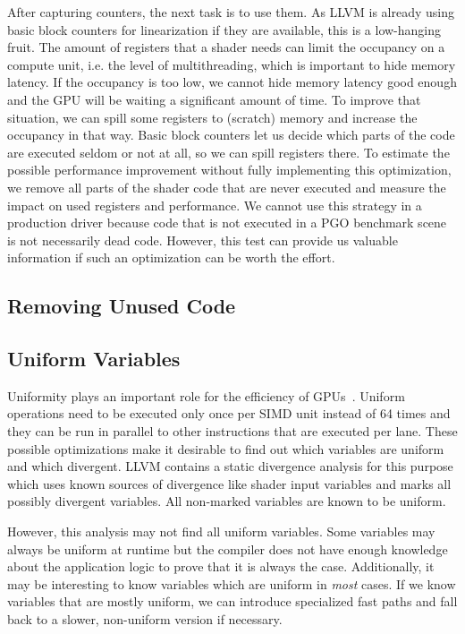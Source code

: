After capturing counters, the next task is to use them. As LLVM is already using basic block counters for linearization if they are available, this is a low-hanging fruit.
The amount of registers that a shader needs can limit the occupancy on a compute unit, i.e. the level of multithreading, which is important to hide memory latency.
If the occupancy is too low, we cannot hide memory latency good enough and the GPU will be waiting a significant amount of time.
To improve that situation, we can spill some registers to (scratch) memory and increase the occupancy in that way.
Basic block counters let us decide which parts of the code are executed seldom or not at all, so we can spill registers there.
To estimate the possible performance improvement without fully implementing this optimization, we remove all parts of the shader code that are never executed and measure the impact on used registers and performance.
We cannot use this strategy in a production driver because code that is not executed in a PGO benchmark scene is not necessarily dead code. However, this test can provide us valuable information if such an optimization can be worth the effort.

\subsection{Removing Unused Code}
\label{sub:design_unused}

\subsection{Uniform Variables}
\label{sub:uniformity}
Uniformity plays an important role for the efficiency of GPUs~\cite{Chen2016}. Uniform operations need to be executed only once per SIMD unit instead of 64 times and they can be run in parallel to other instructions that are executed per lane. These possible optimizations make it desirable to find out which variables are uniform and which divergent. LLVM contains a static divergence analysis for this purpose which uses known sources of divergence like shader input variables and marks all possibly divergent variables. All non-marked variables are known to be uniform.

However, this analysis may not find all uniform variables. Some variables may always be uniform at runtime but the compiler does not have enough knowledge about the application logic to prove that it is always the case. Additionally, it may be interesting to know variables which are uniform in \emph{most} cases. If we know variables that are mostly uniform, we can introduce specialized fast paths and fall back to a slower, non-uniform version if necessary.

